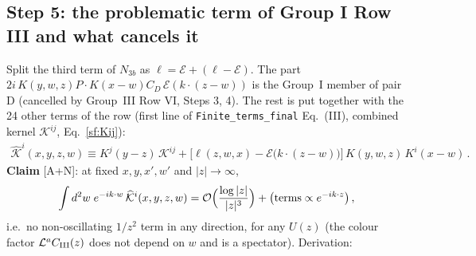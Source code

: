 \subsection{Step 5: the problematic term of Group I Row III and what cancels it}
\noindent Split the third term of $N_{3b}$ as $\ell=\mathcal{E}+(\ell-\mathcal{E})$. The part $2i\,K(y,w,z)P\!\cdot\!K(x-w)C_{D}\,\mathcal{E}(k\cdot(z-w))$ is the Group~I member of pair D (cancelled by Group~III Row VI, Steps 3, 4). The rest is put together with the 24 other terms of the row (first line of \texttt{Finite\_terms\_final} Eq.~(III), combined kernel $\mathcal{K}^{ij}$, Eq.~\eqref{sf:Kij}):
\begin{align}
\widehat{\mathcal{K}}^{i}(x,y,z,w)\equiv K^{j}(y-z)\,\mathcal{K}^{ij}+\Big[\ell(z,w,x)-\mathcal{E}\big(k\cdot(z-w)\big)\Big]\,K(y,w,z)\,K^{i}(x-w)\,.\label{sf:Khat}
\end{align}
\textbf{Claim} [A+N]: at fixed $x,y,x',w'$ and $|z|\to\infty$,
\begin{align}
\int d^{2}w\;e^{-ik\cdot w}\,\widehat{\mathcal{K}}^{i}(x,y,z,w)={\cal O}\Big(\frac{\log|z|}{|z|^{3}}\Big)+\big(\text{terms}\propto e^{-ik\cdot z}\big)\,,\label{sf:claim}
\end{align}
i.e.\ no non-oscillating $1/z^{2}$ term in any direction, for any $U(z)$ (the colour factor $\mathcal{L}^{a}C_{\rm III}(z)$ does not depend on $w$ and is a spectator). Derivation:
